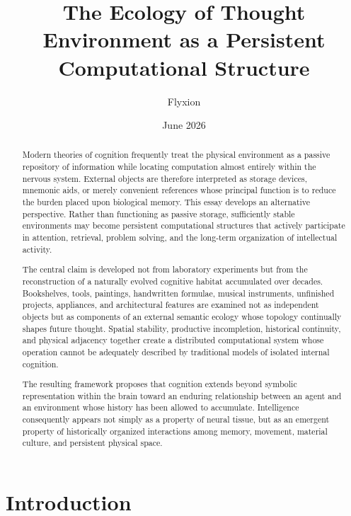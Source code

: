 \documentclass[12pt,oneside]{article}
\title{
{\Large\bfseries
The Ecology of Thought}\\[0.8em]
{\large
Environment as a Persistent Computational Structure}
}
\author{Flyxion}
\date{June 2026}
\theoremstyle{remark}
\begin{document}
\maketitle

\begin{abstract}

Modern theories of cognition frequently treat the physical environment as a passive repository of information while locating computation almost entirely within the nervous system. External objects are therefore interpreted as storage devices, mnemonic aids, or merely convenient references whose principal function is to reduce the burden placed upon biological memory. This essay develops an alternative perspective. Rather than functioning as passive storage, sufficiently stable environments may become persistent computational structures that actively participate in attention, retrieval, problem solving, and the long-term organization of intellectual activity.

The central claim is developed not from laboratory experiments but from the reconstruction of a naturally evolved cognitive habitat accumulated over decades. Bookshelves, tools, paintings, handwritten formulae, musical instruments, unfinished projects, appliances, and architectural features are examined not as independent objects but as components of an external semantic ecology whose topology continually shapes future thought. Spatial stability, productive incompletion, historical continuity, and physical adjacency together create a distributed computational system whose operation cannot be adequately described by traditional models of isolated internal cognition.

The resulting framework proposes that cognition extends beyond symbolic representation within the brain toward an enduring relationship between an agent and an environment whose history has been allowed to accumulate. Intelligence consequently appears not simply as a property of neural tissue, but as an emergent property of historically organized interactions among memory, movement, material culture, and persistent physical space.

\end{abstract}

\tableofcontents

\newpage


\section{Introduction}
\end{document}
